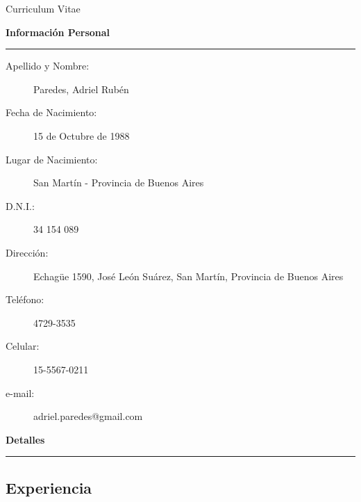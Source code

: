 \documentclass[11pt,4apaper]{article}
\begin{document}
\begin{titlepage}
\vspace*{\fill}
\begin{center}
\Huge{Curriculum Vitae}
\end{center}
\vspace*{\fill}
\end{titlepage}
\newpage


\begin{center}
{\LARGE \textbf{Información Personal}}
\end{center}
\hrule
\vspace{-0.4em}

\begin{description}
\item [Apellido y Nombre:] Paredes, Adriel Rubén 
\item [Fecha de Nacimiento:] 15 de Octubre de 1988
\item [Lugar de Nacimiento:] San Martín - Provincia de Buenos Aires
\item [D.N.I.:] 34 154 089
\item [Dirección:] Echagüe 1590, José León Suárez, San Martín,
    Provincia de Buenos Aires
    \item [Teléfono:] 4729-3535
    \item [Celular:] 15-5567-0211
    \item [e-mail:] adriel.paredes@gmail.com
    \end{description}




    \begin{center}
{\LARGE \textbf{Detalles}}
\end{center}

\hrule
\vspace{-0.4em}

\subsection*{Experiencia}
\end{document}
